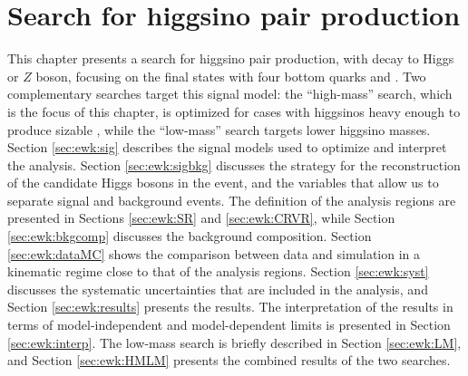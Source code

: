 \chapter{Search for higgsino pair production}
\label{chap:ewk_prod}

This chapter presents a search for higgsino pair production, with decay to Higgs or $Z$ boson, 
focusing on the final states with four bottom quarks and \met. 
Two complementary searches target this signal model: the ``high-mass'' search,
which is the focus of this chapter, is optimized for 
cases with higgsinos heavy enough to produce sizable \met, while the ``low-mass'' search 
targets lower higgsino masses.
Section \ref{sec:ewk:sig} describes the signal models used to optimize and interpret the analysis. 
Section \ref{sec:ewk:sigbkg} discusses the strategy for the reconstruction of the candidate Higgs bosons in the event, 
and the variables that allow us to separate signal and background events. 
The definition of the analysis regions are presented in Sections \ref{sec:ewk:SR} and 
\ref{sec:ewk:CRVR}, 
while Section \ref{sec:ewk:bkgcomp} discusses the background composition. 
Section \ref{sec:ewk:dataMC} shows the comparison between data and simulation in a kinematic regime close to that of the analysis regions. 
Section \ref{sec:ewk:syst} discusses the systematic uncertainties that are included in the analysis, and Section \ref{sec:ewk:results} 
presents the results. 
The interpretation of the results in terms of model-independent and model-dependent limits is presented in Section \ref{sec:ewk:interp}. 
The low-mass search is briefly described in Section \ref{sec:ewk:LM}, and Section \ref{sec:ewk:HMLM}  
presents the combined results of the two searches. 








